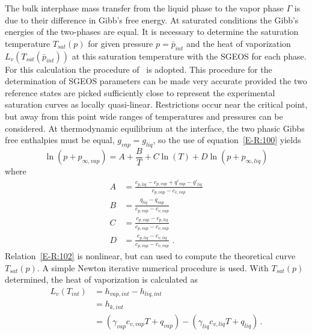 The bulk interphase mass transfer from the liquid phase to the vapor
phase $\Gamma$ is due to their difference in Gibb's free energy.  At
saturated conditions the Gibb's energies of the two-phases are equal.
It is necessary to determine the saturation temperature $T_{sat}(p)$
for given pressure $p=\bar{p}_{int}$ and the heat of vaporization
$L_v\left(T_{sat}(\bar{p}_{int}) \right)$ at this saturation temperature
with the SGEOS for each phase.  For this calculation the procedure
of~\cite{SGEOS} is adopted.  This procedure for the
determination of SGEOS parameters can be made very accurate provided
the two reference states are picked sufficiently close to represent
the experimental saturation curves as locally quasi-linear.
Restrictions occur near the critical point, but away from this point
wide ranges of temperatures and pressures can be considered.  At
thermodynamic equilibrium at the interface, the two phasic Gibbs free
enthalpies must be equal, $g_{vap}=g_{liq}$, so the use of equation~\eqref{E-R:100}
yields
\begin{equation}
  \label{E-R:102}
  \ln \left( p + p_{\infty,  vap} \right) = A + \frac{B}{T} + C  \ln(T) + D  \ln \left( p + p_{\infty,  liq} \right)
\end{equation}
where
\begin{align}
  A &= \frac{c_{p, liq} - c_{p, vap} + q'_{vap} - q'_{liq}}{c_{p,  vap} - c_{v,  vap}} \\
  B &= \frac{q_{liq}-q_{vap}}{c_{p,  vap} - c_{v,  vap}} \\
  C &= \frac{c_{p, vap} - c_{p, liq}}{c_{p,  vap} - c_{v,  vap}} \\
  D &= \frac{c_{p, liq} - c_{v, liq}}{c_{p,  vap} - c_{v,  vap}} \,\,.
\end{align}
Relation~\eqref{E-R:102} is nonlinear, but can used to compute the
theoretical curve $T_{sat}(p)$.  A simple Newton iterative numerical
procedure is used.  With $T_{sat}(p)$ determined, the heat of
vaporization is calculated as
\begin{align}
  \nonumber
  L_v \left( T_{int} \right) &= h_{vap,  int} - h_{liq,  int}
  \\
  \nonumber
  &= h_{k,  int}
  \\
  &= \left( \gamma_{vap}  c_{v, vap}  T + q_{vap} \right) - \left( \gamma_{liq}  c_{v, liq}  T + q_{liq} \right) \,.
\end{align}
%
%
